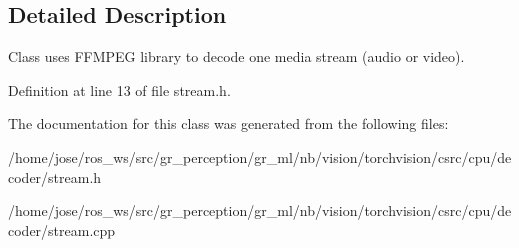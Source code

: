 \subsection{Detailed Description}
Class uses F\+F\+M\+P\+EG library to decode one media stream (audio or video). 

Definition at line 13 of file stream.\+h.



The documentation for this class was generated from the following files\+:\begin{DoxyCompactItemize}
\item 
/home/jose/ros\+\_\+ws/src/gr\+\_\+perception/gr\+\_\+ml/nb/vision/torchvision/csrc/cpu/decoder/stream.\+h\item 
/home/jose/ros\+\_\+ws/src/gr\+\_\+perception/gr\+\_\+ml/nb/vision/torchvision/csrc/cpu/decoder/stream.\+cpp\end{DoxyCompactItemize}
